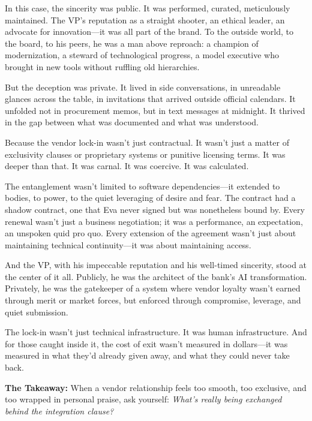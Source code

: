 In this case, the sincerity was public. It was performed, curated, meticulously maintained. The VP’s reputation as a straight shooter, an ethical leader, an advocate for innovation—it was all part of the brand. To the outside world, to the board, to his peers, he was a man above reproach: a champion of modernization, a steward of technological progress, a model executive who brought in new tools without ruffling old hierarchies.

But the deception was private. It lived in side conversations, in unreadable glances across the table, in invitations that arrived outside official calendars. It unfolded not in procurement memos, but in text messages at midnight. It thrived in the gap between what was documented and what was understood.

Because the vendor lock-in wasn’t just contractual. It wasn’t just a matter of exclusivity clauses or proprietary systems or punitive licensing terms. It was deeper than that. It was carnal. It was coercive. It was calculated.

The entanglement wasn’t limited to software dependencies—it extended to bodies, to power, to the quiet leveraging of desire and fear. The contract had a shadow contract, one that Eva never signed but was nonetheless bound by. Every renewal wasn’t just a business negotiation; it was a performance, an expectation, an unspoken quid pro quo. Every extension of the agreement wasn’t just about maintaining technical continuity—it was about maintaining access.

And the VP, with his impeccable reputation and his well-timed sincerity, stood at the center of it all. Publicly, he was the architect of the bank’s AI transformation. Privately, he was the gatekeeper of a system where vendor loyalty wasn’t earned through merit or market forces, but enforced through compromise, leverage, and quiet submission.

The lock-in wasn’t just technical infrastructure. It was human infrastructure. And for those caught inside it, the cost of exit wasn’t measured in dollars—it was measured in what they’d already given away, and what they could never take back.

\medskip

\textbf{The Takeaway:}  
When a vendor relationship feels too smooth, too exclusive, and too wrapped in personal praise, ask yourself:  
\textit{What’s really being exchanged behind the integration clause?}
